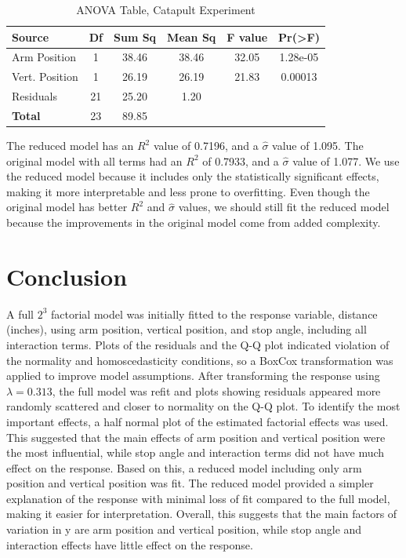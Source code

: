 \documentclass[11pt]{article}
\begin{document}
\begin{table}[H]
\caption{ANOVA Table, Catapult Experiment}
\begin{center}
\begin{tabular}{|l|ccccc|}
\hline
\textbf{Source} & \textbf{Df} & \textbf{Sum Sq} & \textbf{Mean Sq} & \textbf{F value} & \textbf{Pr(>F)} \\
\hline
Arm Position    & 1 & 38.46 & 38.46 & 32.05 & 1.28e-05 \\
Vert. Position  & 1 & 26.19  & 26.19  & 21.83 & 0.00013 \\
Residuals       & 21 & 25.20 & 1.20   &        &          \\
\hline
\textbf{Total}  & 23 & 89.85 & & & \\
\hline
\end{tabular}
\end{center}
\end{table}

The reduced model has an $R^2$ value of 0.7196, and a $\hat{\sigma}$ value of 1.095. The original model with all terms had an $R^2$ of 0.7933, and a $\hat{\sigma}$ value of 1.077. We use the reduced model because it includes only the statistically significant effects, making it more interpretable and less prone to overfitting. Even though the original model has better $R^2$ and $\hat{\sigma}$ values, we should still fit the reduced model because the improvements in the original model come from added complexity.

\section*{Conclusion}


A full $2^3$ factorial model was initially fitted to the response variable, distance (inches), using arm position, vertical position, and stop angle, including all interaction terms. Plots of the residuals and the Q-Q plot indicated violation of the normality and homoscedasticity conditions, so a BoxCox transformation was applied to improve model assumptions. After transforming the response using $\lambda = 0.313$, the full model was refit and plots showing residuals appeared more randomly scattered and closer to normality on the Q-Q plot. To identify the most important effects, a half normal plot of the estimated factorial effects was used. This suggested that the main effects of arm position and vertical position were the most influential, while stop angle and interaction terms did not have much effect on the response. Based on this, a reduced model including only arm position and vertical position was fit. The reduced model provided a simpler explanation of the response with minimal loss of fit compared to the full model, making it easier for interpretation. Overall, this suggests that the main factors of variation in y are arm position and vertical position, while stop angle and interaction effects have little effect on the response.
\end{document}
